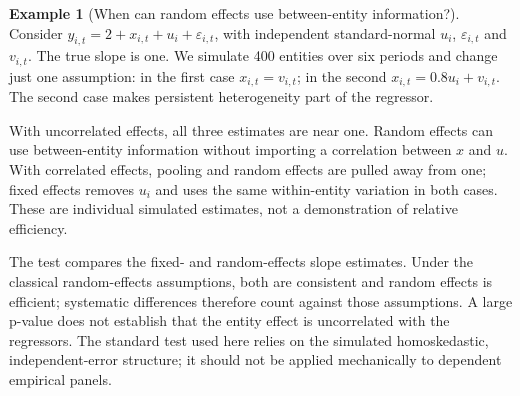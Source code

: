 \documentclass[
  11pt,
]{book}
\theoremstyle{definition}
\theoremstyle{definition}
\newtheorem{example}{Example}[chapter]
\theoremstyle{definition}
\theoremstyle{definition}
\theoremstyle{remark}
\begin{document}
\begin{example}[When can random effects use between-entity information?]
\protect\hypertarget{exm:panel-random-simulation}{}\label{exm:panel-random-simulation}Consider \(y_{i,t}=2+x_{i,t}+u_i+\varepsilon_{i,t}\), with independent standard-normal \(u_i\), \(\varepsilon_{i,t}\) and \(v_{i,t}\). The true slope is one. We simulate 400 entities over six periods and change just one assumption: in the first case \(x_{i,t}=v_{i,t}\); in the second \(x_{i,t}=0.8u_i+v_{i,t}\). The second case makes persistent heterogeneity part of the regressor.

\begin{table}[H]
\centering\begingroup\fontsize{10}{12}\selectfont

\endgroup{}
\end{table}

With uncorrelated effects, all three estimates are near one. Random effects can use between-entity information without importing a correlation between \(x\) and \(u\). With correlated effects, pooling and random effects are pulled away from one; fixed effects removes \(u_i\) and uses the same within-entity variation in both cases. These are individual simulated estimates, not a demonstration of relative efficiency.

The \citet{Hausman_1978} test compares the fixed- and random-effects slope estimates. Under the classical random-effects assumptions, both are consistent and random effects is efficient; systematic differences therefore count against those assumptions. A large p-value does not establish that the entity effect is uncorrelated with the regressors. The standard test used here relies on the simulated homoskedastic, independent-error structure; it should not be applied mechanically to dependent empirical panels.
\end{example}
\end{document}
